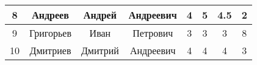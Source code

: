 \begin{table}[h!]
\begin{tabular}{|c|c|c|c|c|c|c|c|}
        8                  & Андреев                  & Андрей               & Андреевич                 & 4                           & 5                               & 4.5          & 2    \\ \hline
        9                  & Григорьев                & Иван                 & Петрович                  & 3                           & 3                               & 3            & 8    \\ \hline
        10                 & Дмитриев                 & Дмитрий              & Андреевич                 & 4                           & 4                               & 4            & 3    \\ \hline
    \end{tabular}
\end{table}